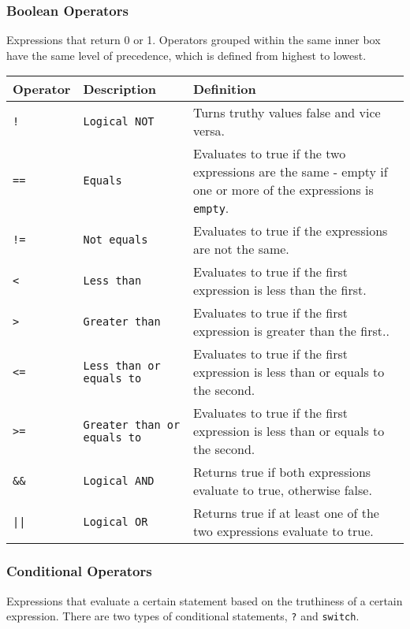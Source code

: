 		\subsubsection{Boolean Operators}
			Expressions that return 0 or 1. Operators grouped within the same inner box have the same level of precedence, which is defined from highest to lowest.
			\begin{table}[H]
			\begin{tabular}{ |p{2cm}|p{5cm}|p{7cm}|  }
			\hline
			\textbf{Operator} & \textbf{Description} & \textbf{Definition} \\ \hline
			\texttt{!} & \texttt{Logical NOT} & {Turns truthy values false and vice versa.} \\ \hline
			\texttt{==} & \texttt{Equals} & {Evaluates to true if the two expressions are the same - empty if one or more of the expressions is \texttt{empty}.} \\
			\texttt{!=} & \texttt{Not equals} & {Evaluates to true if the expressions are not the same.} \\
			\texttt{<} & \texttt{Less than} & {Evaluates to true if the first expression is less than the first.} \\
			\texttt{>} & \texttt{Greater than} & {Evaluates to true if the first expression is greater than the first.}. \\
			\texttt{<=} & \texttt{Less than or equals to} & {Evaluates to true if the first expression is less than or equals to the second.} \\
			\texttt{>=} & \texttt{Greater than or equals to} & {Evaluates to true if the first expression is less than or equals to the second.} \\ \hline
			\texttt{\&\&} & \texttt{Logical AND} & {Returns true if both expressions evaluate to true, otherwise false.} \\ \hline
			\texttt{||} & \texttt{Logical OR} & {Returns true if at least one of the two expressions evaluate to true.} \\ \hline
			\end{tabular}
			\end{table}
		\subsubsection{Conditional Operators}
			Expressions that evaluate a certain statement based on the truthiness of a certain expression. There are two types of conditional statements, \texttt{?} and \texttt{switch}.
			
